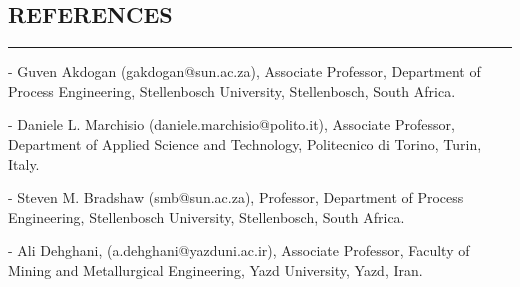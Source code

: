 \documentclass[10pt,a4]{article}
\begin{document}
\subsection*{REFERENCES}
\hrule
\vspace{0.2cm}

\begin{list}{}{}
\item - Guven Akdogan (gakdogan@sun.ac.za), Associate Professor, Department of Process Engineering, Stellenbosch University, Stellenbosch, South Africa.
\item - Daniele L. Marchisio (daniele.marchisio@polito.it), Associate Professor, Department of Applied Science and Technology, Politecnico di Torino, Turin, Italy.
\item - Steven M. Bradshaw (smb@sun.ac.za), Professor, Department of Process Engineering, Stellenbosch University, Stellenbosch, South Africa.
\item - Ali Dehghani, (a.dehghani@yazduni.ac.ir), Associate Professor, Faculty of Mining and Metallurgical Engineering, Yazd University, Yazd, Iran.
\end{list}

\thispagestyle{fancy}
\rfoot{\textcolor{gray}{Page \thepage}}
\fancyfoot[C]{}
\end{document}
